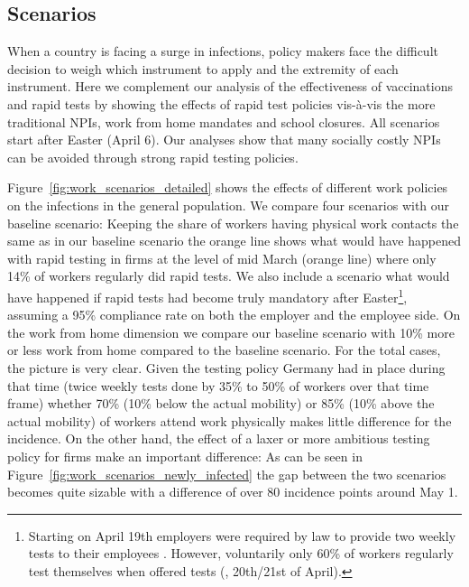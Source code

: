 \subsection{Scenarios} 
\label{subsec:appendix_scenarios}

When a country is facing a surge in infections, policy makers face the difficult decision
to weigh which instrument to apply and the extremity of each instrument. Here we
complement our analysis of the effectiveness of vaccinations and rapid tests by showing
the effects of rapid test policies vis-à-vis the more traditional NPIs, work from home
mandates and school closures. All scenarios start after Easter (April 6). Our analyses
show that many socially costly NPIs can be avoided through strong rapid testing policies.

Figure~\ref{fig:work_scenarios_detailed} shows the effects of different work policies on
the infections in the general population. We compare four scenarios with our baseline
scenario: Keeping the share of workers having physical work contacts the same as in our
baseline scenario the orange line shows what would have happened with rapid testing in
firms at the level of mid March (orange line) where only 14\% of workers regularly did
rapid tests. %
We also include a scenario what would have happened if rapid tests had become truly
mandatory after Easter\footnote{Starting on April 19th employers were required by law to
provide two weekly tests to their employees \citep{Bundesanzeiger2021}. However,
voluntarily only 60\% of workers regularly test themselves when offered tests
(\cite{Betsch2021}, 20th/21st of April).}, assuming a 95\% compliance rate on both the
employer and the employee side. On the work from home dimension we compare our baseline
scenario with 10\% more or less work from home compared to the baseline scenario. For the
total cases, the picture is very clear. Given the testing policy Germany had in place
during that time (twice weekly tests done by 35\% to 50\% of workers over that time
frame) whether 70\% (10\% below the actual mobility) or 85\% (10\% above the actual
mobility) of workers attend work physically makes little difference for the incidence. On
the other hand, the effect of a laxer or more ambitious testing policy for firms make an
important difference: As can be seen in Figure~\ref{fig:work_scenarios_newly_infected}
the gap between the two scenarios becomes quite sizable with a difference of over 80
incidence points around May 1.


